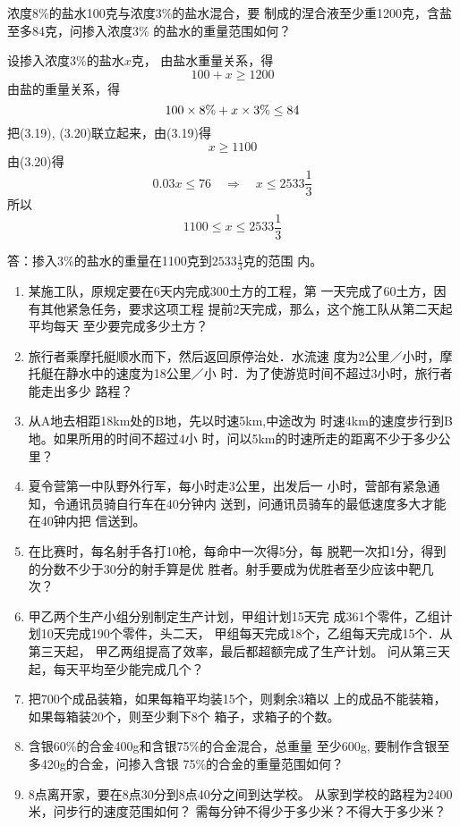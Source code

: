 \begin{example}
浓度8\%的盐水100克与浓度3\%的盐水混合，要
制成的涅合液至少重1200克，含盐至多84克，问掺入浓度3\%
的盐水的重量范围如何？
\end{example}


\begin{solution}
设掺入浓度3\%的盐水$x$克，
由盐水重量关系，得
\begin{equation}
    100+x\ge 1200
\end{equation}
由盐的重量关系，得
\begin{equation}
    100\times8\%+x \times 3\%\le 84
\end{equation}
把(3.19), (3.20)联立起来，由(3.19)得
\[x\ge 1100\]
由(3.20)得
\[0.03x\le 76\quad \Rightarrow\quad 
x\le 2533\frac{1}{3}\]
所以
\[1100\le x\le 2533\frac{1}{3}\]

答：掺入3\%的盐水的重量在1100克到$2533\frac{1}{3}$克的范围
内。
\end{solution}


\begin{ex}
\begin{enumerate}
    \item 某施工队，原规定要在6天内完成300土方的工程，第
    一天完成了60土方，因有其他紧急任务，要求这项工程
    提前2天完成，那么，这个施工队从第二天起平均每天
    至少要完成多少土方？
    \item 旅行者乘摩托艇顺水而下，然后返回原停治处．水流速
    度为2公里／小时，摩托艇在静水中的速度为18公里／小
    时．为了使游览时间不超过3小时，旅行者能走出多少
    路程？
    \item 从A地去相距18km处的B地，先以时速5km,中途改为
    时速4km的速度步行到B地。如果所用的时间不超过4小
    时，问以5km的时速所走的距离不少于多少公里？
    \item 夏令营第一中队野外行军，每小时走3公里，出发后一
    小时，营部有紧急通知，令通讯员骑自行车在40分钟内
    送到，问通讯员骑车的最低速度多大才能在40钟内把
    信送到。
    \item 在比赛时，每名射手各打10枪，每命中一次得5分，每
    脱靶一次扣1分，得到的分数不少于30分的射手算是优
    胜者。射手要成为优胜者至少应该中靶几次？
    \item 
    甲乙两个生产小组分别制定生产计划，甲组计划15天完
    成361个零件，乙组计划10天完成190个零件，头二天，
    甲组每天完成18个，乙组每天完成15个．从第三天起，
    甲乙两组提高了效率，最后都超额完成了生产计划。
    问从第三天起，每天平均至少能完成几个？
    \item 把700个成品装箱，如果每箱平均装15个，则剩余3箱以
上的成品不能装箱，如果每箱装20个，则至少剩下8个
箱子，求箱子的个数。
\item 
含银60\%的合金400g和含银75\%的合金混合，总重量
至少600g, 要制作含银至多420g的合金，问掺入含银
75\%的合金的重量范围如何？
\item 
8点离开家，要在8点30分到8点40分之间到达学校。
从家到学校的路程为2400米，问步行的速度范围如何？
需每分钟不得少于多少米？不得大于多少米？
\end{enumerate}
\end{ex}

